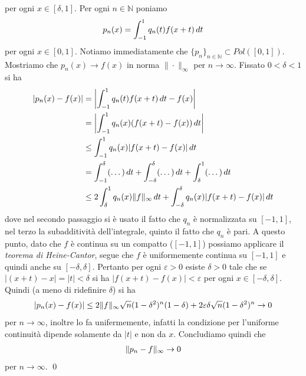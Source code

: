 \documentclass{article}
\numberwithin{equation}{subsection}
\begin{document}
per ogni $x \in [\delta, 1]$. Per ogni $n \in \mathbb{N}$ poniamo 
\begin{align*}
    p_n(x) = \int_{-1}^1 q_n(t)f(x + t) \, dt \notag
\end{align*}
per ogni $x \in [0, 1]$. Notiamo immediatamente che $\{p_n\}_{n \in \mathbb{N}} \subset Pol([0, 1])$. Mostriamo che $p_n(x) \rightarrow f(x)$ in norma $\|\cdot\|_\infty$ per $n \rightarrow \infty$. Fissato $0 < \delta < 1$ si ha
\begin{align*}
    |p_n(x) - f(x)| &= \left|\int_{-1}^1 q_n(t)f(x + t) \, dt - f(x)\right| \notag \\
    &= \left|\int_{-1}^1 q_n(x)(f(x + t) - f(x)) \, dt\right| \notag \\
    &\leq \int_{-1}^1 q_n(x)|f(x + t) - f(x)| \, dt \notag \\
    &= \int_{-1}^\delta (\dots) \, dt + \int_{-\delta}^\delta (\dots) \, dt  + \int_{\delta}^1 (\dots)  \, dt \notag \\
    &\leq 2\int_{\delta}^1 q_n(x)\|f\|_\infty \, dt + \int_{-\delta}^\delta q_n(x)|f(x + t) - f(x)| \, dt \notag
\end{align*}
dove nel secondo passaggio si è usato il fatto che $q_n$ è normalizzata su $[-1, 1]$, nel terzo la subadditività dell'integrale, quinto il fatto che $q_n$ è pari. A questo punto, dato che $f$ è continua su un compatto ($[-1, 1]$) possiamo applicare il \textit{teorema di Heine-Cantor}, segue che $f$ è uniformemente continua su $[-1, 1]$ e quindi anche su $[-\delta, \delta]$. Pertanto per ogni $\varepsilon > 0$ esiste $\delta > 0$ tale che se $|(x + t) - x| = |t| < \delta$ si ha $|f(x + t) - f(x)| < \varepsilon$ per ogni $x \in [-\delta, \delta]$. Quindi (a meno di ridefinire $\delta$) si ha
\begin{align*}
    |p_n(x) - f(x)| \leq 2\|f\|_\infty\sqrt{n}(1 - \delta^2)^n(1 - \delta) + 2\varepsilon\delta\sqrt{n}(1 - \delta^2)^n \rightarrow 0 \notag
\end{align*}
per $n \rightarrow \infty$, inoltre lo fa unifermemente, infatti la condizione per l'uniforme continuità dipende solamente da $|t|$ e non da $x$. Concludiamo quindi che 
\begin{align*}
    \|p_n - f\|_{\infty} \rightarrow 0 \notag
\end{align*}
per $n \rightarrow \infty$. \qed
\end{document}
